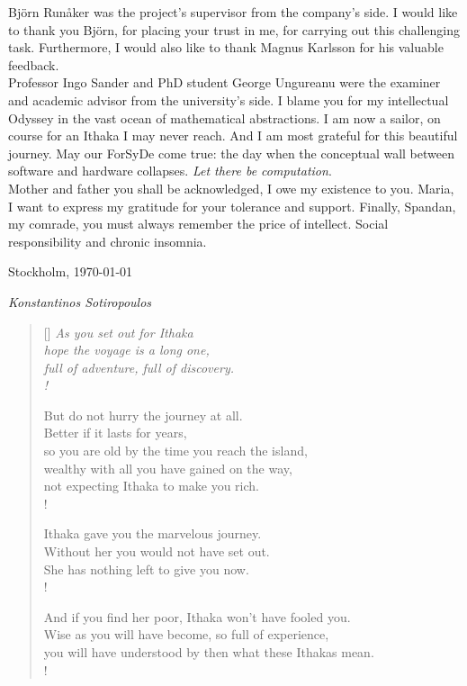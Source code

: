 \documentclass[11pt]{article}
\newcommand{\attrib}[1]{\nopagebreak{\raggedcenter \footnotesize #1\par}}
\begin{document}
Björn Runåker was the project's supervisor from the company's side.
I would like to thank you Björn, for placing your trust in me, for carrying out this challenging task.
Furthermore, I would also like to thank Magnus Karlsson for his valuable feedback.\\

Professor Ingo Sander and PhD student George Ungureanu were the examiner and academic advisor from the university's side. 
I blame you for my intellectual Odyssey in the vast ocean of mathematical abstractions.
I am now a sailor, on course for an Ithaka I may never reach.
And I am most grateful for this beautiful journey.
May our ForSyDe come true: the day when the conceptual wall between software and hardware collapses.
\textit{Let there be computation}.\\

Mother and father you shall be acknowledged, I owe my existence to you.
Maria, I want to express my gratitude for your tolerance and support.
Finally, Spandan, my comrade, you must always remember the price of intellect.
Social responsibility and chronic insomnia.

\vspace{1.0cm}

\noindent
Stockholm, \today

\textit{Konstantinos Sotiropoulos}
\clearpage

\begin{LATEX}
\begin{verse}[\linewidth]
\itshape  As you set out for Ithaka \\
          hope the voyage is a long one, \\
          full of adventure, full of discovery. \\!

          But do not hurry the journey at all. \\
          Better if it lasts for years, \\
          so you are old by the time you reach the island, \\
          wealthy with all you have gained on the way, \\
          not expecting Ithaka to make you rich. \\!

          Ithaka gave you the marvelous journey. \\
          Without her you would not have set out. \\
          She has nothing left to give you now. \\!
 
          And if you find her poor, Ithaka won’t have fooled you. \\
          Wise as you will have become, so full of experience, \\
          you will have understood by then what these Ithakas mean. \\!
	  
	  \attrib{ Konstantinos Kavafis, Ithaka }
\end{verse}
\clearpage
\end{LATEX}
\end{document}
